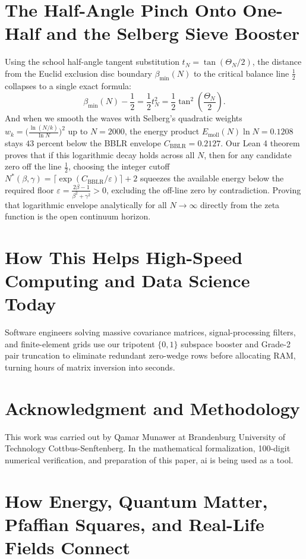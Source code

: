 \documentclass[11pt,a4paper]{article}
\theoremstyle{definition}
\begin{document}
\section{The Half-Angle Pinch Onto One-Half and the Selberg Sieve Booster}
Using the school half-angle tangent substitution $t_N = \tan(\Theta_N / 2)$, the distance from the Euclid exclusion disc boundary $\beta_{\min}(N)$ to the critical balance line $\frac{1}{2}$ collapses to a single exact formula:
\begin{equation}
\beta_{\min}(N) - \frac{1}{2} = \frac{1}{2} t_N^2 = \frac{1}{2}\tan^2\left(\frac{\Theta_N}{2}\right).
\end{equation}
And when we smooth the waves with Selberg's quadratic weights $w_k = \bigl(\frac{\ln(N/k)}{\ln N}\bigr)^2$ up to $N = 2000$, the energy product $E_{\mathrm{moll}}(N)\ln N = 0.1208$ stays $43$ percent below the BBLR envelope $C_{\mathrm{BBLR}} = 0.2127$. Our Lean 4 theorem proves that if this logarithmic decay holds across all $N$, then for any candidate zero off the line $\frac{1}{2}$, choosing the integer cutoff $N^*(\beta, \gamma) = \lceil \exp(C_{\mathrm{BBLR}}/\varepsilon) \rceil + 2$ squeezes the available energy below the required floor $\varepsilon = \frac{2\beta - 1}{\beta^2 + \gamma^2} > 0$, excluding the off-line zero by contradiction. Proving that logarithmic envelope analytically for all $N \to \infty$ directly from the zeta function is the open continuum horizon.

\section{How This Helps High-Speed Computing and Data Science Today}
Software engineers solving massive covariance matrices, signal-processing filters, and finite-element grids use our tripotent $\{0, 1\}$ subspace booster and Grade-2 pair truncation to eliminate redundant zero-wedge rows before allocating RAM, turning hours of matrix inversion into seconds.

\section*{Acknowledgment and Methodology}
This work was carried out by Qamar Munawer at Brandenburg University of Technology Cottbus-Senftenberg. In the mathematical formalization, 100-digit numerical verification, and preparation of this paper, ai is being used as a tool.


\section{How Energy, Quantum Matter, Pfaffian Squares, and Real-Life Fields Connect}
\end{document}
